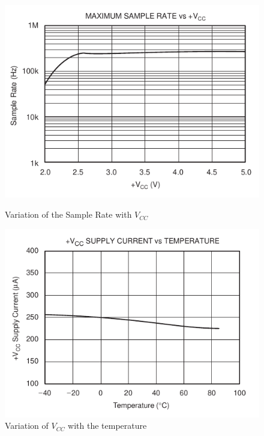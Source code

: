 \documentclass[11pt,a4paper,titlepage]{article}
\begin{document}
			\begin{figure}[htbp]
				\begin{minipage}{.5\textwidth}
					\centering
					\includegraphics[width=\textwidth]{samplerate_vcc.png}
					\caption{Variation of the Sample Rate with $V_{CC}$}
					\label{fig:sample_vcc}
				\end{minipage}
				\begin{minipage}{.5\textwidth}
					\centering
					\includegraphics[width=\textwidth]{VCC_temp.png}
					\caption{Variation of $V_{CC}$ with the temperature}
					\label{fig:vcc_temp}
				\end{minipage}
			\end{figure}
\end{document}
